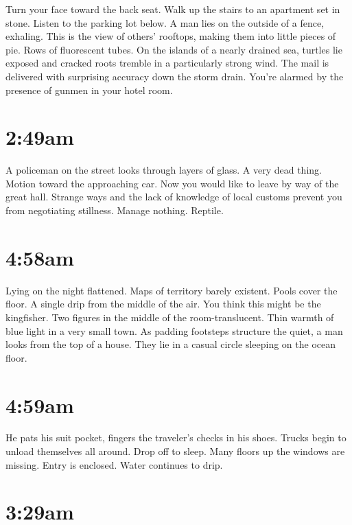 \documentclass[
]{memoir}
\begin{document}
Turn your face toward the back seat. Walk up the stairs to an apartment
set in stone. Listen to the parking lot below. A man lies on the outside
of a fence, exhaling. This is the view of others' rooftops, making them
into little pieces of pie. Rows of fluorescent tubes. On the islands of
a nearly drained sea, turtles lie exposed and cracked roots tremble in a
particularly strong wind. The mail is delivered with surprising accuracy
down the storm drain. You're alarmed by the presence of gunmen in your
hotel room.

\hypertarget{am-2}{%
\section*{2:49am}\label{am-2}}

A policeman on the street looks through layers of glass. A very dead
thing. Motion toward the approaching car. Now you would like to leave by
way of the great hall. Strange ways and the lack of knowledge of local
customs prevent you from negotiating stillness. Manage nothing. Reptile.

\hypertarget{am-3}{%
\section*{4:58am}\label{am-3}}

Lying on the night flattened. Maps of territory barely existent. Pools
cover the floor. A single drip from the middle of the air. You think
this might be the kingfisher. Two figures in the middle of the
room-translucent. Thin warmth of blue light in a very small town. As
padding footsteps structure the quiet, a man looks from the top of a
house. They lie in a casual circle sleeping on the ocean floor.

\hypertarget{am-4}{%
\section*{4:59am}\label{am-4}}

He pats his suit pocket, fingers the traveler's checks in his shoes.
Trucks begin to unload themselves all around. Drop off to sleep. Many
floors up the windows are missing. Entry is enclosed. Water continues to
drip.

\hypertarget{am-5}{%
\section*{3:29am}\label{am-5}}
\end{document}
